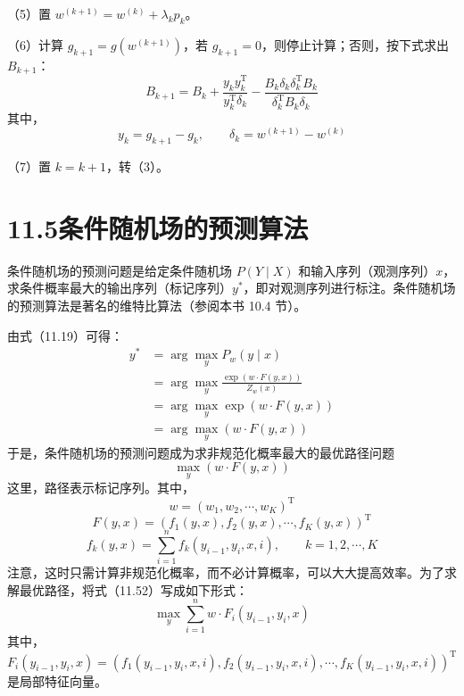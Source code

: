 \documentclass[UTF8, 12pt, fontset=fandol, oneside]{ctexart}
\begin{document}
（5）置 $w^{(k+1)}=w^{(k)}+\lambda_kp_k$。

（6）计算 $g_{k+1}=g(w^{(k+1)})$，若 $g_{k+1}=0$，则停止计算；否则，按下式求出 $B_{k+1}$：
\[
B_{k+1}=B_k+\frac{y_ky_k^{\mathrm T}}{y_k^{\mathrm T}\delta_k}
-\frac{B_k\delta_k\delta_k^{\mathrm T}B_k}{\delta_k^{\mathrm T}B_k\delta_k}
\]
其中，
\[
y_k=g_{k+1}-g_k,\qquad \delta_k=w^{(k+1)}-w^{(k)}
\]

（7）置 $k=k+1$，转（3）。

\section*{11.5\quad 条件随机场的预测算法}

条件随机场的预测问题是给定条件随机场 $P(Y\mid X)$ 和输入序列（观测序列）$x$，求条件概率最大的输出序列（标记序列）$y^*$，即对观测序列进行标注。条件随机场的预测算法是著名的维特比算法（参阅本书 10.4 节）。

由式（11.19）可得：
\begin{equation}
\begin{aligned}
y^*&=\arg\max_y P_w(y\mid x)\\
&=\arg\max_y\frac{\exp(w\cdot F(y,x))}{Z_w(x)}\\
&=\arg\max_y\exp(w\cdot F(y,x))\\
&=\arg\max_y(w\cdot F(y,x))
\end{aligned}
\tag{11.52}
\end{equation}
于是，条件随机场的预测问题成为求非规范化概率最大的最优路径问题
\[
\max_y(w\cdot F(y,x))
\]
这里，路径表示标记序列。其中，
\[
w=(w_1,w_2,\cdots,w_K)^{\mathrm T}
\]
\[
F(y,x)=(f_1(y,x),f_2(y,x),\cdots,f_K(y,x))^{\mathrm T}
\]
\[
f_k(y,x)=\sum_{i=1}^{n}f_k(y_{i-1},y_i,x,i),\qquad k=1,2,\cdots,K
\]
注意，这时只需计算非规范化概率，而不必计算概率，可以大大提高效率。为了求解最优路径，将式（11.52）写成如下形式：
\begin{equation}
\max_y\sum_{i=1}^{n}w\cdot F_i(y_{i-1},y_i,x)
\tag{11.53}
\end{equation}
其中，
\[
F_i(y_{i-1},y_i,x)=
(f_1(y_{i-1},y_i,x,i),f_2(y_{i-1},y_i,x,i),\cdots,f_K(y_{i-1},y_i,x,i))^{\mathrm T}
\]
是局部特征向量。
\end{document}

